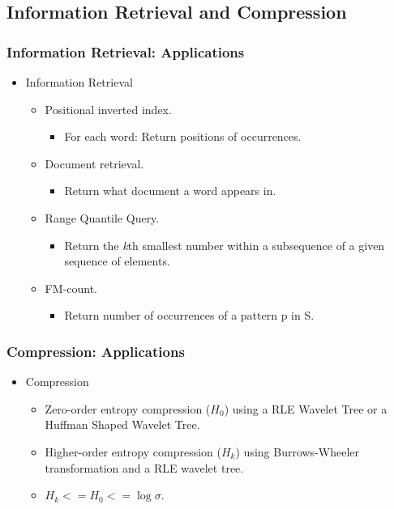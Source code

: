 \documentclass{beamer}
\begin{document}
\subsection{Information Retrieval and Compression}
\begin{frame}
\frametitle{Information Retrieval: Applications}
\begin{itemize}
\item Information Retrieval
	\begin{itemize}
	\item Positional inverted index.
	\begin{itemize}
	\item For each word: Return positions of occurrences.
	\end{itemize}
	\item Document retrieval.
	\begin{itemize}
	\item Return what document a word appears in.
	\end{itemize}
	\item Range Quantile Query.
	\begin{itemize}
	\item Return the \textit{k}th smallest number within a subsequence of a given sequence of elements.
	\end{itemize}	
	\item FM-count. 
	\begin{itemize}
	\item Return number of occurrences of a pattern p in S.
	\end{itemize}	 
	\end{itemize}
\end{itemize}
\end{frame}

\begin{frame}
\frametitle{Compression: Applications}
\begin{itemize}
\item Compression
	\begin{itemize}
	\item Zero-order entropy compression ($H_0$) using a RLE Wavelet Tree or a Huffman Shaped Wavelet Tree.
	\item Higher-order entropy compression ($H_k$) using Burrows-Wheeler transformation and a RLE wavelet tree.
	\item $H_k <= H_0 <= \log \sigma$.
	\end{itemize}
\end{itemize}
\end{frame}
\end{document}
